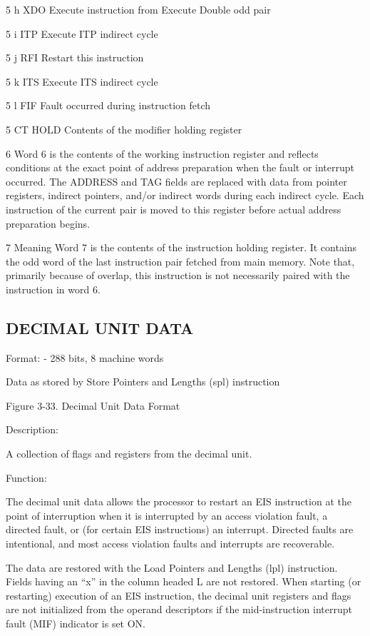 5 h XDO Execute instruction from Execute Double odd pair

5 i ITP Execute ITP indirect cycle

5 j RFI Restart this instruction

5 k ITS Execute ITS indirect cycle

5 l FIF Fault occurred during instruction fetch

5 CT HOLD Contents of the modifier holding register

6 Word 6 is the contents of the working instruction register and reflects
conditions at the exact point of address preparation when the fault or
interrupt occurred. The ADDRESS and TAG fields are replaced with data from
pointer registers, indirect pointers, and/or indirect words during each
indirect cycle. Each instruction of the current pair is moved to this register
before actual address preparation begins.

7 Meaning Word 7 is the contents of the instruction holding register. It
contains the odd word of the last instruction pair fetched from main memory.
Note that, primarily because of overlap, this instruction is not necessarily
paired with the instruction in word 6.

\subsection{DECIMAL UNIT DATA}

Format: - 288 bits, 8 machine words

Data as stored by Store Pointers and Lengths (spl) instruction

Figure 3-33. Decimal Unit Data Format

Description:

A collection of flags and registers from the decimal unit.

Function:

The decimal unit data allows the processor to restart an EIS instruction at the
point of interruption when it is interrupted by an access violation fault, a
directed fault, or (for certain EIS instructions) an interrupt. Directed faults
are intentional, and most access violation faults and interrupts are
recoverable.

The data are restored with the Load Pointers and Lengths (lpl) instruction.
Fields having an {``}x'' in the column headed L are not restored. When starting
(or restarting) execution of an EIS instruction, the decimal unit registers and
flags are not initialized from the operand descriptors if the mid-instruction
interrupt fault (MIF) indicator is set ON.


